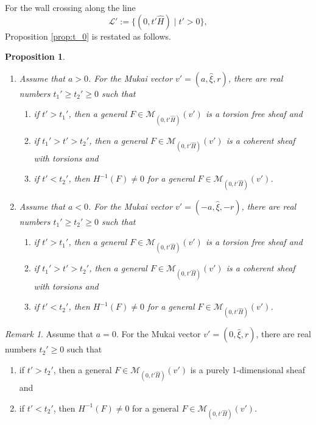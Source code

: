 \documentclass[10pt]{amsart}
\def\cal{\mathcal}
\numberwithin{equation}{section}
\theoremstyle{plain}
\newtheorem{prop}[thm]{Proposition}
\theoremstyle{definition}
\theoremstyle{remark}
\newtheorem{rem}[thm]{Remark}
\begin{document}
For the wall crossing along the line 
$$
{\cal L}':=\{(0,t' \widehat{H}) \mid t'>0 \},
$$
Proposition \ref{prop:t_0} is restated as follows.
 
\begin{prop}\label{prop:t_0'}
\begin{enumerate}
\item[(1)]
Assume that $a>0$. For the Mukai vector $v'=(a,\widehat{\xi},r)$,
there are real numbers $t_1' \geq t_2' \geq 0$ such that
\begin{enumerate}
\item
if $t'>t_1'$, then a general $F \in {\cal M}_{(0,t' \widehat{H})}(v')$
is a torsion free sheaf and
\item
if $t_1'>t'>t_2'$, then a general $F \in {\cal M}_{(0,t' \widehat{H})}(v')$
is a coherent sheaf with torsions and
\item
if $t'<t_2'$, then
 $H^{-1}(F) \ne 0$ for a general $F \in {\cal M}_{(0,t' \widehat{H})}(v')$.
\end{enumerate}
\item[(2)]
Assume that $a<0$. For the Mukai vector $v'=(-a,\widehat{\xi},-r)$,
there are real numbers $t_1' \geq t_2' \geq 0$ such that
\begin{enumerate}
\item
if $t'>t_1'$, then a general $F \in {\cal M}_{(0,t' \widehat{H})}(v')$ 
is a torsion free sheaf and
\item
if $t_1'>t'>t_2'$, then a general $F \in {\cal M}_{(0,t' \widehat{H})}(v')$
is a coherent sheaf with torsions and
\item
if $t'<t_2'$, then
 $H^{-1}(F) \ne 0$ for a general $F \in {\cal M}_{(0,t' \widehat{H})}(v')$.
\end{enumerate}
\end{enumerate}
\end{prop}

\begin{rem}
Assume that $a=0$.
For the Mukai vector $v'=(0,\widehat{\xi},r)$,
there are real numbers $t_2' \geq 0$ such that
\begin{enumerate}
\item
if $t'>t_2'$, then a general $F \in {\cal M}_{(0,t' \widehat{H})}(v')$
is a purely 1-dimensional sheaf and
\item
if $t'<t_2'$, then
 $H^{-1}(F) \ne 0$ for a general $F \in {\cal M}_{(0,t' \widehat{H})}(v')$.
\end{enumerate}
\end{rem}
\end{document}
